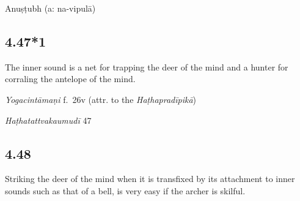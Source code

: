 \begin{ekdosis}
\begin{metre}[hp04_047]
Anuṣṭubh (a: na-vipulā)
\end{metre}

\subsection*{4.47*1}
\begin{translation}[hp04_047_1]
The inner sound is a net for trapping the deer of the mind and a hunter for corraling the antelope of the mind.
\end{translation}


\begin{testimonia}[hp04_047_1]
\emph{Yogacintāmaṇi} f.~26v (attr. to the \emph{Haṭhapradīpikā})
\begin{versinnote}
\end{versinnote}

\emph{Haṭhatattvakaumudī} 47
\begin{versinnote}
\end{versinnote}
\end{testimonia}

\begin{philcomm}[hp04_047_1]
%
\end{philcomm}



\subsection*{4.48}
\begin{translation}[hp04_048]
Striking the deer of the mind when it is transfixed by its attachment to inner sounds such as that of a bell, is very easy if the archer is skilful.
\end{translation}
%


\end{ekdosis}
